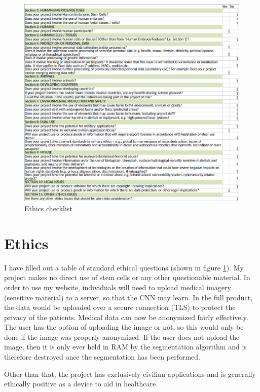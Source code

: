 \appendix 

\begin{figure} [hb!]
\centering
\includegraphics[scale=0.5]{pictures/ethics2}
\caption{Ethics checklist}
\label{fig:ethics}
\end{figure}

\section{Ethics}
I have filled out a table of standard ethical questions (shown in figure \ref{fig:ethics}). My project makes no direct use of stem cells or any other questionable material. In order to use my website, individuals will need to upload medical imagery (sensitive material) to a server, so that the CNN may learn. In the full product, the data would be uploaded over a secure connection (TLS) to protect the privacy of the patients. Medical data can now be anonymized fairly effectively. The user has the option of uploading the image or not, so this would only be done if the image was properly anonymized. If the user does not upload the image, then it is only ever held in RAM by the segmentation algorithm and is therefore destroyed once the segmentation has been performed.

Other than that, the project has exclusively civilian applications and is generally ethically positive as a device to aid in healthcare.



